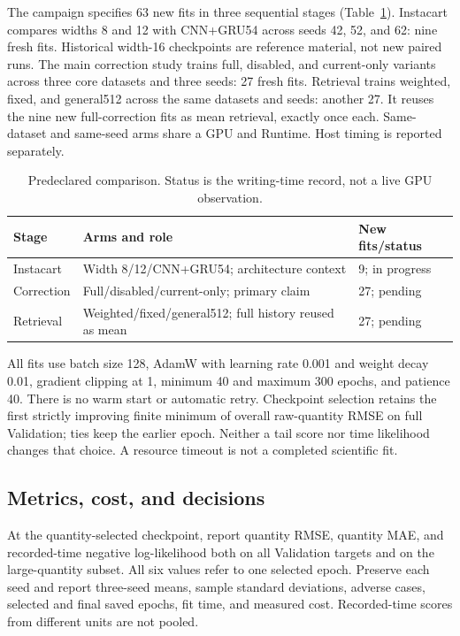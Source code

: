 \documentclass[runningheads]{llncs}
\begin{document}
The campaign specifies 63 new fits in
three sequential stages (Table~\ref{tab:design}).
Instacart compares widths 8 and 12 with CNN+GRU54
across seeds 42, 52, and 62: nine fresh fits.
Historical width-16 checkpoints are reference
material, not new paired runs. The main correction
study trains full, disabled, and current-only
variants across three core datasets and three
seeds: 27 fresh fits. Retrieval trains weighted,
fixed, and general512 across the same datasets
and seeds: another 27. It reuses the nine new
full-correction fits as mean retrieval, exactly
once each. Same-dataset and same-seed arms
share a GPU and Runtime. Host timing is reported
separately.

\begin{table}[t]
\caption{Predeclared comparison. Status is the
writing-time record, not a live GPU observation.}
\label{tab:design}
\centering\small
\begin{tabular}{p{}p{}p{}}
\toprule
Stage & Arms and role & New fits/status\\
\midrule
Instacart & Width 8/12/CNN+GRU54;
architecture context & 9; in progress\\
Correction & Full/disabled/current-only;
primary claim & 27; pending\\
Retrieval & Weighted/fixed/general512;
full history reused as mean & 27; pending\\
\bottomrule
\end{tabular}
\end{table}

All fits use batch size 128, AdamW with learning
rate 0.001 and weight decay 0.01, gradient clipping
at 1, minimum 40 and maximum 300 epochs, and
patience 40. There is no warm start or automatic
retry. Checkpoint selection retains the first
strictly improving finite minimum of overall
raw-quantity RMSE on full Validation; ties keep
the earlier epoch. Neither a tail score nor
time likelihood changes that choice. A resource
timeout is not a completed scientific fit.

\subsection{Metrics, cost, and decisions}
At the quantity-selected checkpoint, report quantity
RMSE, quantity MAE, and recorded-time negative
log-likelihood both on all Validation targets and
on the large-quantity subset. All six values refer
to one selected epoch. Preserve each seed and
report three-seed means, sample standard
deviations, adverse cases, selected and final
saved epochs, fit time, and measured cost.
Recorded-time scores from different units
are not pooled.
\end{document}
